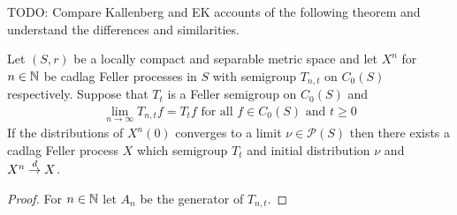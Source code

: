 TODO: Compare Kallenberg and EK accounts of the following theorem and understand the differences and similarities.
\begin{thm}\label{KurtzMackevicius}Let $(S,r)$ be a locally compact and separable metric space and let $X^n$ for $n \in \mathbb{N}$ be
cadlag Feller processes in $S$ with semigroup $T_{n,t}$ on $C_0(S)$ respectively.  Suppose that $T_t$ is a Feller semigroup on $C_0(S)$ and
\begin{align*}
\lim_{n \to \infty} T_{n,t} f = T_t f \text{ for all $f \in C_0(S)$ and $t \geq 0$}
\end{align*}
If the distributions of $X^n(0)$ converges to a limit $\nu \in \mathcal{P}(S)$ then there exists a cadlag Feller process $X$ which semigroup
$T_t$ and initial distribution $\nu$ and $X^n \overset{d}\to X$.
\end{thm} 
\begin{proof}
For $n \in \mathbb{N}$ let $A_n$ be the generator of $T_{n,t}$.
\end{proof}

